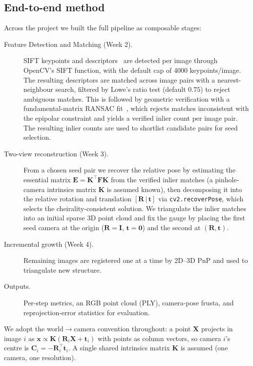 \documentclass{article} %
\begin{document}
\subsection{End-to-end method}
Across the project we built the full pipeline as composable stages:
\begin{description}
  \item[Feature Detection and Matching (Week 2).] SIFT keypoints and descriptors~\citep{lowe2004sift} are detected per image through OpenCV's SIFT function, with the
    default cap of 4000 keypoints/image. The resulting descriptors are matched across image pairs with a nearest-neighbour search, filtered by Lowe's ratio test (default $0.75$) to reject ambiguous matches.
    This is followed by geometric verification with a fundamental-matrix RANSAC fit~\citep{fischler1981ransac}, which rejects matches inconsistent with the epipolar constraint and yields a verified inlier count per image pair.
    The resulting inlier counts are used to shortlist candidate pairs for seed selection.
  \item[Two-view reconstruction (Week 3).] From a chosen seed pair we recover the
  relative pose by estimating the essential matrix $\mathbf{E}=\mathbf{K}^{\top}\mathbf{F}\mathbf{K}$
  from the verified inlier matches (a pinhole-camera intrinsics matrix $\mathbf{K}$
  is assumed known), then decomposing it into the relative rotation and translation
  $[\mathbf{R}\,|\,\mathbf{t}]$ via \texttt{cv2.recoverPose}, which selects the
  cheirality-consistent solution. We triangulate the inlier matches into an initial
  sparse 3D point cloud and fix the gauge by placing the first seed camera at the
  origin ($\mathbf{R}=\mathbf{I}$, $\mathbf{t}=\mathbf{0}$) and the second at
  $(\mathbf{R},\mathbf{t})$.
  \item[Incremental growth (Week 4).] Remaining images are registered one at a
  time by 2D--3D PnP and used to triangulate new structure.
  \item[Outputs.] Per-step metrics, an RGB point cloud (PLY), camera-pose frusta,
  and reprojection-error statistics for evaluation.
\end{description}
We adopt the world$\rightarrow$camera convention throughout: a point
$\mathbf{X}$ projects in image $i$ as $\mathbf{x} \propto \mathbf{K}(\mathbf{R}_i
\mathbf{X} + \mathbf{t}_i)$ with points as column vectors, so camera $i$'s centre
is $\mathbf{C}_i = -\mathbf{R}_i^{\top}\mathbf{t}_i$. A single shared intrinsics
matrix $\mathbf{K}$ is assumed (one camera, one resolution).
\end{document}
